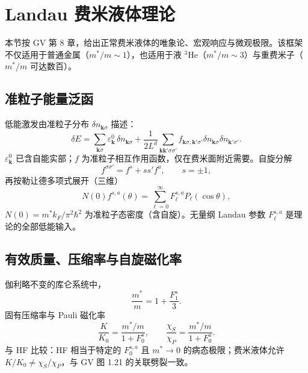 \section{Landau 费米液体理论}

本节按 GV 第 8 章，给出正常费米液体的唯象论、宏观响应与微观极限。该框架不仅适用于普通金属（$m^*/m\sim1$），也适用于液 $^3$He（$m^*/m\sim3$）与重费米子（$m^*/m$ 可达数百）。

\subsection{准粒子能量泛函}

低能激发由准粒子分布 $\delta n_{\mathbf{k}\sigma}$ 描述：
\begin{equation}
  \delta E
  =\sum_{\mathbf{k}\sigma}
  \varepsilon_{\mathbf{k}}^0\,\delta n_{\mathbf{k}\sigma}
  +\frac{1}{2L^d}
  \sum_{\mathbf{k}\mathbf{k}'\sigma\sigma'}
  f_{\mathbf{k}\sigma,\mathbf{k}'\sigma'}
  \delta n_{\mathbf{k}\sigma}\delta n_{\mathbf{k}'\sigma'}.
\label{eq:landauE}
\end{equation}
$\varepsilon_{\mathbf{k}}^0$ 已含自能实部；$f$ 为准粒子相互作用函数，仅在费米面附近需要。自旋分解
\begin{equation}
  f^{\sigma\sigma'}
  =f^s+s s' f^a,
  \qquad s=\pm1,
\end{equation}
再按勒让德多项式展开（三维）
\begin{equation}
  N(0)f^{s,a}(\theta)
  =\sum_{\ell=0}^{\infty}
  F_\ell^{s,a}P_\ell(\cos\theta),
\end{equation}
$N(0)=m^*k_F/\pi^2\hbar^2$ 为准粒子态密度（含自旋）。无量纲 Landau 参数 $F_\ell^{s,a}$ 是理论的全部低能输入。

\subsection{有效质量、压缩率与自旋磁化率}

伽利略不变的库仑系统中，
\begin{equation}
  \frac{m^*}{m}=1+\frac{F_1^s}{3}.
\label{eq:mstar}
\end{equation}
固有压缩率与 Pauli 磁化率
\begin{equation}
  \frac{K}{K_0}
  =\frac{m^*/m}{1+F_0^s},
  \qquad
  \frac{\chi_S}{\chi_P}
  =\frac{m^*/m}{1+F_0^a}.
\label{eq:Kchi_FL}
\end{equation}
与 HF 比较：HF 相当于特定的 $F_0^{s,a}$ 且 $m^*\to0$ 的病态极限；费米液体允许 $K/K_0\neq\chi_S/\chi_P$，与 GV 图 1.21 的关联劈裂一致。

